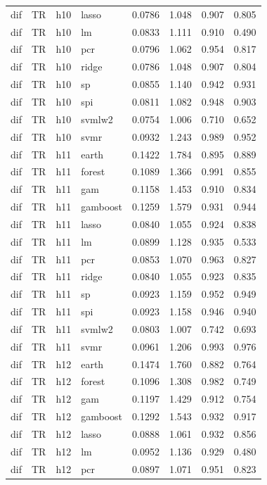 \begin{ThreePartTable}
\begin{longtable}[t]{llclcccc}
dif & TR & h10 & lasso & 0.0786 & 1.048 & 0.907 & 0.805\\
dif & TR & h10 & lm & 0.0833 & 1.111 & 0.910 & 0.490\\
dif & TR & h10 & pcr & 0.0796 & 1.062 & 0.954 & 0.817\\
dif & TR & h10 & ridge & 0.0786 & 1.048 & 0.907 & 0.804\\
dif & TR & h10 & sp & 0.0855 & 1.140 & 0.942 & 0.931\\
dif & TR & h10 & spi & 0.0811 & 1.082 & 0.948 & 0.903\\
dif & TR & h10 & svmlw2 & 0.0754 & 1.006 & 0.710 & 0.652\\
dif & TR & h10 & svmr & 0.0932 & 1.243 & 0.989 & 0.952\\
\addlinespace
dif & TR & h11 & earth & 0.1422 & 1.784 & 0.895 & 0.889\\
dif & TR & h11 & forest & 0.1089 & 1.366 & 0.991 & 0.855\\
dif & TR & h11 & gam & 0.1158 & 1.453 & 0.910 & 0.834\\
dif & TR & h11 & gamboost & 0.1259 & 1.579 & 0.931 & 0.944\\
dif & TR & h11 & lasso & 0.0840 & 1.055 & 0.924 & 0.838\\
dif & TR & h11 & lm & 0.0899 & 1.128 & 0.935 & 0.533\\
dif & TR & h11 & pcr & 0.0853 & 1.070 & 0.963 & 0.827\\
dif & TR & h11 & ridge & 0.0840 & 1.055 & 0.923 & 0.835\\
dif & TR & h11 & sp & 0.0923 & 1.159 & 0.952 & 0.949\\
dif & TR & h11 & spi & 0.0923 & 1.158 & 0.946 & 0.940\\
dif & TR & h11 & svmlw2 & 0.0803 & 1.007 & 0.742 & 0.693\\
dif & TR & h11 & svmr & 0.0961 & 1.206 & 0.993 & 0.976\\
\addlinespace
dif & TR & h12 & earth & 0.1474 & 1.760 & 0.882 & 0.764\\
dif & TR & h12 & forest & 0.1096 & 1.308 & 0.982 & 0.749\\
dif & TR & h12 & gam & 0.1197 & 1.429 & 0.912 & 0.754\\
dif & TR & h12 & gamboost & 0.1292 & 1.543 & 0.932 & 0.917\\
dif & TR & h12 & lasso & 0.0888 & 1.061 & 0.932 & 0.856\\
dif & TR & h12 & lm & 0.0952 & 1.136 & 0.929 & 0.480\\
dif & TR & h12 & pcr & 0.0897 & 1.071 & 0.951 & 0.823\\

\end{longtable}
\end{ThreePartTable}
